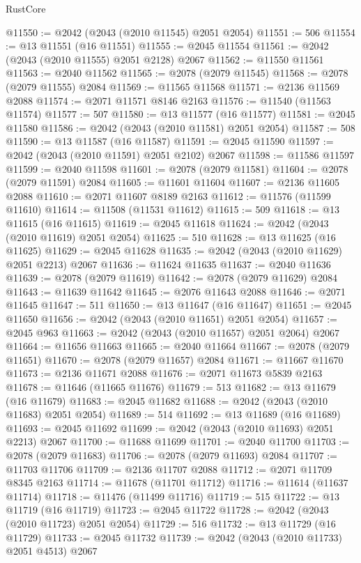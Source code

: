 \begin{lexlean}{RustCore}
\begin{coremodule}
@11550 := @2042 (@2043 (@2010 @11545) @2051 @2054)
@11551 := 506
@11554 := @13 @11551 (@16 @11551)
@11555 := @2045 @11554
@11561 := @2042 (@2043 (@2010 @11555) @2051 @2128) @2067
@11562 := @11550 @11561
@11563 := @2040 @11562
@11565 := @2078 (@2079 @11545)
@11568 := @2078 (@2079 @11555) @2084
@11569 := @11565 @11568
@11571 := @2136 @11569 @2088
@11574 := @2071 @11571 @8146 @2163
@11576 := @11540 (@11563 @11574)
@11577 := 507
@11580 := @13 @11577 (@16 @11577)
@11581 := @2045 @11580
@11586 := @2042 (@2043 (@2010 @11581) @2051 @2054)
@11587 := 508
@11590 := @13 @11587 (@16 @11587)
@11591 := @2045 @11590
@11597 := @2042 (@2043 (@2010 @11591) @2051 @2102) @2067
@11598 := @11586 @11597
@11599 := @2040 @11598
@11601 := @2078 (@2079 @11581)
@11604 := @2078 (@2079 @11591) @2084
@11605 := @11601 @11604
@11607 := @2136 @11605 @2088
@11610 := @2071 @11607 @8189 @2163
@11612 := @11576 (@11599 @11610)
@11614 := @11508 (@11531 @11612)
@11615 := 509
@11618 := @13 @11615 (@16 @11615)
@11619 := @2045 @11618
@11624 := @2042 (@2043 (@2010 @11619) @2051 @2054)
@11625 := 510
@11628 := @13 @11625 (@16 @11625)
@11629 := @2045 @11628
@11635 := @2042 (@2043 (@2010 @11629) @2051 @2213) @2067
@11636 := @11624 @11635
@11637 := @2040 @11636
@11639 := @2078 (@2079 @11619)
@11642 := @2078 (@2079 @11629) @2084
@11643 := @11639 @11642
@11645 := @2076 @11643 @2088
@11646 := @2071 @11645
@11647 := 511
@11650 := @13 @11647 (@16 @11647)
@11651 := @2045 @11650
@11656 := @2042 (@2043 (@2010 @11651) @2051 @2054)
@11657 := @2045 @963
@11663 := @2042 (@2043 (@2010 @11657) @2051 @2064) @2067
@11664 := @11656 @11663
@11665 := @2040 @11664
@11667 := @2078 (@2079 @11651)
@11670 := @2078 (@2079 @11657) @2084
@11671 := @11667 @11670
@11673 := @2136 @11671 @2088
@11676 := @2071 @11673 @5839 @2163
@11678 := @11646 (@11665 @11676)
@11679 := 513
@11682 := @13 @11679 (@16 @11679)
@11683 := @2045 @11682
@11688 := @2042 (@2043 (@2010 @11683) @2051 @2054)
@11689 := 514
@11692 := @13 @11689 (@16 @11689)
@11693 := @2045 @11692
@11699 := @2042 (@2043 (@2010 @11693) @2051 @2213) @2067
@11700 := @11688 @11699
@11701 := @2040 @11700
@11703 := @2078 (@2079 @11683)
@11706 := @2078 (@2079 @11693) @2084
@11707 := @11703 @11706
@11709 := @2136 @11707 @2088
@11712 := @2071 @11709 @8345 @2163
@11714 := @11678 (@11701 @11712)
@11716 := @11614 (@11637 @11714)
@11718 := @11476 (@11499 @11716)
@11719 := 515
@11722 := @13 @11719 (@16 @11719)
@11723 := @2045 @11722
@11728 := @2042 (@2043 (@2010 @11723) @2051 @2054)
@11729 := 516
@11732 := @13 @11729 (@16 @11729)
@11733 := @2045 @11732
@11739 := @2042 (@2043 (@2010 @11733) @2051 @4513) @2067

\end{coremodule}
\end{lexlean}

